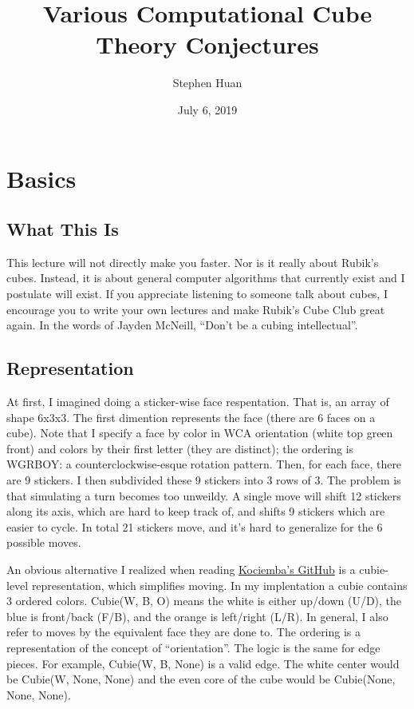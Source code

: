 \documentclass[11pt, oneside]{article}
\title{Various Computational Cube Theory Conjectures}
\author{Stephen Huan}
\date{July 6, 2019}
\begin{document}
\maketitle

\section{Basics}
\subsection{What This Is}

This lecture will not directly make you faster. Nor is it really about Rubik's cubes.
Instead, it is about general computer algorithms that currently exist and I postulate will exist.
If you appreciate listening to someone talk about cubes, I encourage you to write your own lectures
and make Rubik's Cube Club great again. In the words of Jayden McNeill, ``Don't be a cubing intellectual''.

\subsection{Representation}

At first, I imagined doing a sticker-wise face respentation. That is, an array of shape 6x3x3.
The first dimention represents the face (there are 6 faces on a cube). Note that I specify a face by color in
WCA orientation (white top green front) and colors by their first letter (they are distinct); the ordering is WGRBOY: a counterclockwise-esque rotation pattern. Then, for each face, there are 9 stickers. I then subdivided these 9 stickers
into 3 rows of 3. The problem is that simulating a turn becomes too unweildy. A single move will shift 12 stickers along its axis, which are hard to keep track of, and shifts 9 stickers which are easier to cycle. In total 21 stickers move, and it's hard to generalize for the 6 possible moves.

An obvious alternative I realized when reading \href{https://github.com/hkociemba/RubiksCube-TwophaseSolver}{Kociemba's GitHub} is a cubie-level representation, which simplifies moving.
In my implentation a cubie contains 3 ordered colors.
Cubie(W, B, O) means the white is either up/down (U/D), the blue is front/back (F/B), and the orange is left/right (L/R).
In general, I also refer to moves by the equivalent face they are done to.
The ordering is a representation of the concept of ``orientation''.
The logic is the same for edge pieces. For example, Cubie(W, B, None) is a valid edge.
The white center would be Cubie(W, None, None) and the even core of the cube would be Cubie(None, None, None).
\end{document}
